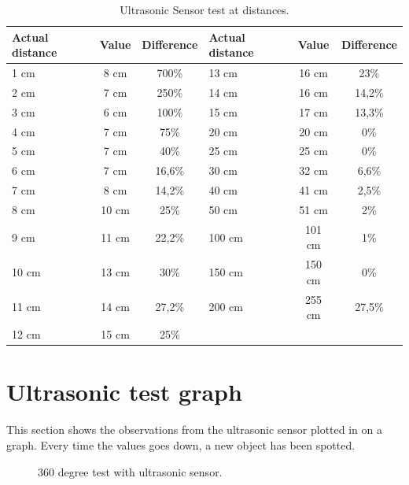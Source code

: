 \begin{table}[H]
	\centering
    \begin{tabular}{|lcc|lcc|}
    \hline  
    \rowcolor{DGray}
    \textbf{Actual distance} & \textbf{Value}  & \textbf{Difference} &\textbf{Actual distance} & \textbf{Value}  & \textbf{Difference}\\ \hline
    1 cm     & 8 cm     & 700\%  &    13 cm     & 16 cm     & 23\% \\
    2 cm     & 7 cm     & 250\%  &    14 cm     & 16 cm     & 14,2\% \\
    3 cm     & 6 cm     & 100\%  &    15 cm     & 17 cm     & 13,3\% \\
    4 cm     & 7 cm     & 75\%   &    20 cm     & 20 cm     & 0\% \\
    5 cm     & 7 cm     & 40\%   &    25 cm     & 25 cm     & 0\% \\
    6 cm     & 7 cm     & 16,6\% &    30 cm     & 32 cm     & 6,6\% \\
    7 cm     & 8 cm     & 14,2\% &    40 cm     & 41 cm     & 2,5\% \\
    8 cm     & 10 cm    & 25\%   &    50 cm     & 51 cm     & 2\% \\
    9 cm     & 11 cm    & 22,2\% &    100 cm    & 101 cm    & 1\% \\
    10 cm    & 13 cm    & 30\%   &    150 cm    & 150 cm    & 0\% \\
    11 cm    & 14 cm    & 27,2\% &    200 cm    & 255 cm    & 27,5\% \\
    12 cm    & 15 cm    & 25\%   &              &           &\\
    \hline 
    \end{tabular}
    \caption{\label{table:app_ultrasonic_sensor_test} Ultrasonic Sensor test at distances.}
\end{table}



\section{Ultrasonic test graph} \label{app:sonar-test-graph}
This section shows the observations from the ultrasonic sensor plotted in on a graph. Every time the values goes down, a new object has been spotted.

\begin{figure}[H]
     \caption{\label{fig:sonar-test-graph} 360 degree test with ultrasonic sensor.}
\end{figure}
